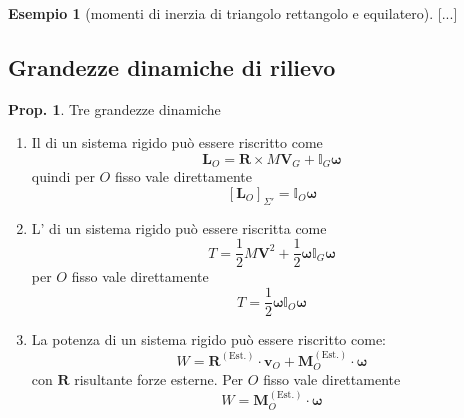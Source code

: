 \documentclass[a4paper,10pt]{article}
\theoremstyle{definition}
\newcommand{\bv}{\boldsymbol} %
\theoremstyle{indentdefinition}
\theoremstyle{indenttheorem}
\newtheorem{prop}{Prop.}
\theoremstyle{myremark}
\newtheorem{example*}{Esempio}
\theoremstyle{indentgeneral}
\newenvironment{myboxed} 
{\noindent\begin{lrbox}{\mybox}\begin{minipage}{\textwidth}}
{\end{minipage}\end{lrbox}\fbox{\usebox{\mybox}}}
\begin{document}
\begin{example*}[momenti di inerzia di triangolo rettangolo e equilatero]
{[}...{]}
\end{example*}

\subsection{Grandezze dinamiche di rilievo}
\begin{myboxed}
\begin{prop} Tre grandezze dinamiche
\begin{enumerate}
    \item Il  di un sistema rigido può essere
riscritto come $$\boldsymbol{L}_{O}=\boldsymbol{R}\times M\boldsymbol{V}_{G}+\mathbb{I}_{G}\boldsymbol{\omega}$$
quindi per $O$ fisso vale direttamente $$\boxed{[\boldsymbol{L}_{O}]_{\Sigma'}=\mathbb{I}_{O}\boldsymbol{\omega}}$$
\item  L' di un sistema rigido può essere
riscritta come $$T=\frac{1}{2}M\boldsymbol{V}^{2}+\frac{1}{2}\boldsymbol{\omega}\mathbb{I}_{G}\boldsymbol{\omega}$$
per $O$ fisso vale direttamente 
$$\boxed{T=\frac{1}{2}\boldsymbol{\omega}\mathbb{I}_{O}\boldsymbol{\omega}}$$
\item La potenza di un sistema rigido può essere
riscritto come: $$W=\bv{R}^{(\text{Est.})}\cdot\bv{v}_O+\bv{M}_O^{(\text{Est.})}\cdot\bv{\omega}$$
con $\bv{R}$ risultante forze esterne. Per $O$ fisso vale direttamente 
$$\boxed{W=\bv{M}_O^{(\text{Est.})}\cdot\bv{\omega}}$$
\end{enumerate}
\end{prop}
\end{myboxed}
\end{document}
